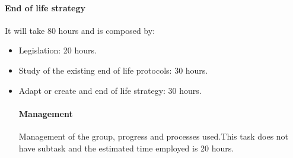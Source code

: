\documentclass[12pt,a4paper]{article}
\begin{document}
\paragraph{End of life strategy}
It will take 80 hours and is composed by:
\begin{itemize}
\item Legislation: 20 hours.
\item Study of the existing end of life protocols: 30 hours.
\item Adapt or create and end of life strategy: 30 hours.
\paragraph{Management}
Management of the group, progress and processes used.This task does not have subtask and the estimated time employed is 20 hours.
\end{itemize} 
\end{document}
